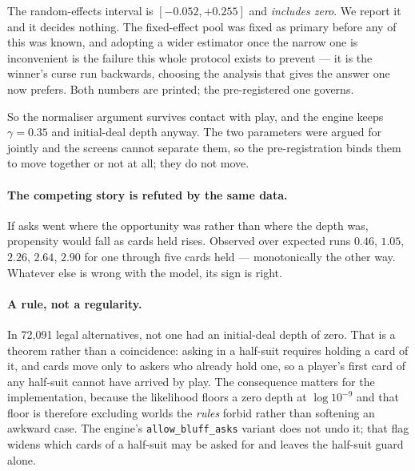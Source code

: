 \documentclass[11pt,a4paper]{article}
\begin{document}
The random-effects interval is $[-0.052, +0.255]$ and \emph{includes zero}. We
report it and it decides nothing. The fixed-effect pool was fixed as primary
before any of this was known, and adopting a wider estimator once the narrow one
is inconvenient is the failure this whole protocol exists to prevent --- it is
the winner's curse run backwards, choosing the analysis that gives the answer
one now prefers. Both numbers are printed; the pre-registered one governs.

So the normaliser argument survives contact with play, and the engine keeps
$\gamma = 0.35$ and initial-deal depth anyway. The two parameters were argued
for jointly and the screens cannot separate them, so the pre-registration binds
them to move together or not at all; they do not move.

\paragraph{The competing story is refuted by the same data.} If asks went where
the opportunity was rather than where the depth was, propensity would fall as
cards held rises. Observed over expected runs $0.46$, $1.05$, $2.26$, $2.64$,
$2.90$ for one through five cards held --- monotonically the other way. Whatever
else is wrong with the model, its sign is right.

\paragraph{A rule, not a regularity.} In 72{,}091 legal alternatives, not one had
an initial-deal depth of zero. That is a theorem rather than a coincidence:
asking in a half-suit requires holding a card of it, and cards move only to
askers who already hold one, so a player's first card of any half-suit cannot
have arrived by play. The consequence matters for the implementation, because
the likelihood floors a zero depth at $\log 10^{-9}$ and that floor is therefore
excluding worlds the \emph{rules} forbid rather than softening an awkward case.
The engine's \texttt{allow\_bluff\_asks} variant does not undo it; that flag
widens which cards of a half-suit may be asked for and leaves the half-suit
guard alone.
\end{document}
